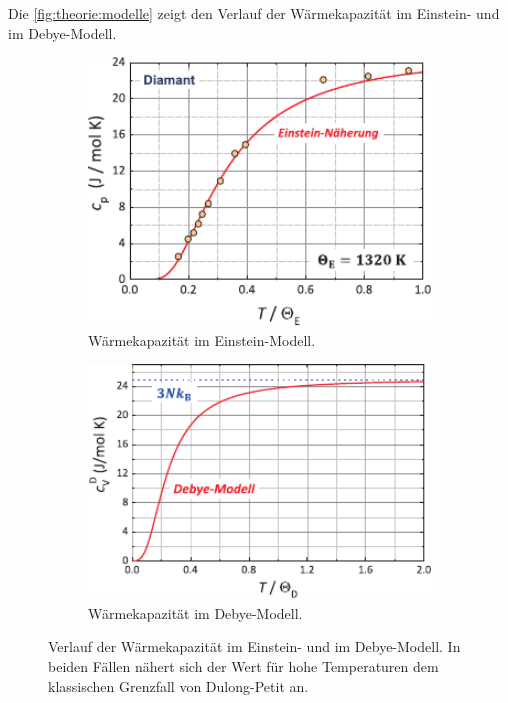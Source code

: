     Die \autoref{fig:theorie:modelle} zeigt den Verlauf der Wärmekapazität im Einstein- und im Debye-Modell.
    \begin{figure}
        \centering
        \begin{subfigure}{0.48\textwidth}
            \centering
            \includegraphics[width=1\textwidth]{content/img/Gross_Marx/6_5.pdf}
            \caption{Wärmekapazität im Einstein-Modell.}
            \label{fig:theorie:einsteinmodell}
        \end{subfigure}
        \hfill
        \begin{subfigure}{0.48\textwidth}
            \centering
            \includegraphics[width=1\textwidth]{content/img/Gross_Marx/6_7.pdf}
            \caption{Wärmekapazität im Debye-Modell.}
            \label{fig:theorie:debyemodell}
        \end{subfigure}
        \caption{Verlauf der Wärmekapazität im Einstein- und im Debye-Modell.
        In beiden Fällen nähert sich der Wert für hohe Temperaturen dem klassischen Grenzfall von Dulong-Petit an. \cite{grossmarx}}
        \label{fig:theorie:modelle}
    \end{figure}

